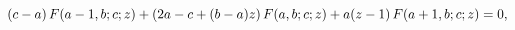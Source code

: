 \[(c-a)\mathop{F\/}\nolimits\!\left(a-1,b;c;z\right)+\left(2a-c+(b-a)z\right)%
\mathop{F\/}\nolimits\!\left(a,b;c;z\right)+a(z-1)\mathop{F\/}\nolimits\!\left%
(a+1,b;c;z\right)=0,\]